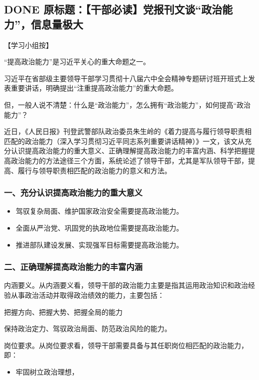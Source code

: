 \documentclass[11pt]{ctexart}
\begin{document}
{{{{\subsection{{\bfseries\sffamily DONE} 原标题：【干部必读】党报刊文谈“政治能力”，信息量极大}
\label{sec:org4bce716}
【学习小组按】

“提高政治能力”是习近平关心的重大命题之一。

习近平在省部级主要领导干部学习贯彻十八届六中全会精神专题研讨班开班式上发表重要讲话，明确提出“注重提高政治能力”的重大命题。

但，一般人说不清楚：什么是“政治能力”，怎么拥有“政治能力”，如何提高“政治能力”？

近日，《人民日报》刊登武警部队政治委员朱生岭的《着力提高与履行领导职责相匹配的政治能力（深入学习贯彻习近平同志系列重要讲话精神）》一文，该文从充分认识提高政治能力的重大意义、正确理解提高政治能力的丰富内涵、科学把握提高政治能力的方法途径三个方面，系统论述了领导干部，尤其是军队领导干部，提高、履行与领导职责相匹配的政治能力的意义和方法。

\subsubsection{一、充分认识提高政治能力的重大意义}
\label{sec:org5b8f526}

\begin{itemize}
\item 驾驭复杂局面、维护国家政治安全需要提高政治能力。

\item 全面从严治党、巩固党的执政地位需要提高政治能力。

\item 推进部队建设发展、实现强军目标需要提高政治能力。
\end{itemize}

\subsubsection{二、正确理解提高政治能力的丰富内涵}
\label{sec:org4143b9f}

内涵要义。从内涵要义看，领导干部的政治能力主要是指其运用政治知识和政治经验从事政治活动并取得政治绩效的能力，主要包括：

把握方向、把握大势、把握全局的能力

保持政治定力、驾驭政治局面、防范政治风险的能力。

岗位要求。从岗位要求看，领导干部需要具备与其任职岗位相匹配的政治能力，即：

\begin{itemize}
\item 牢固树立政治理想，


\end{itemize}}}}}
\end{document}
